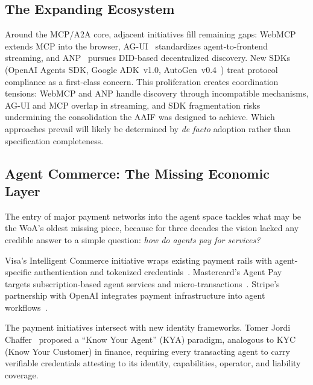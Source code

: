 \documentclass{IEEEcsmag}
\begin{document}
\subsection{The Expanding Ecosystem}\label{sec:ecosystem}

Around the MCP/A2A core, adjacent initiatives fill remaining gaps: WebMCP~\cite{WebMCP_W3C_2025} extends MCP into the browser, AG-UI~\cite{AGUI_2025} standardizes agent-to-frontend streaming, and ANP~\cite{W3C_ANP_2025} pursues DID-based decentralized discovery. New SDKs (OpenAI Agents SDK, Google ADK~v1.0, AutoGen~v0.4~\cite{Microsoft_AutoGen_2023}) treat protocol compliance as a first-class concern.  This proliferation creates coordination tensions: WebMCP and ANP handle discovery through incompatible mechanisms, AG-UI and MCP overlap in streaming, and SDK fragmentation risks undermining the consolidation the AAIF was designed to achieve.  Which approaches prevail will likely be determined by \emph{de facto} adoption rather than specification completeness.

\subsection{Agent Commerce: The Missing Economic Layer}\label{sec:commerce}

The entry of major payment networks into the agent space tackles what may be the WoA's oldest missing piece, because for three decades the vision lacked any credible answer to a simple question: \emph{how do agents pay for services?}

Visa's Intelligent Commerce initiative wraps existing payment rails with agent-specific authentication and tokenized credentials~\cite{Visa_TAP_2025}. Mastercard's Agent Pay targets subscription-based agent services and micro-transactions~\cite{Mastercard_AgentPay_2025}. Stripe's partnership with OpenAI integrates payment infrastructure into agent workflows~\cite{Stripe_OpenAI_ACP_2025}.

The payment initiatives intersect with new identity frameworks. Tomer Jordi Chaffer~\cite{KYA_Paradigm_2025} proposed a ``Know Your Agent'' (KYA) paradigm, analogous to KYC (Know Your Customer) in finance, requiring every transacting agent to carry verifiable credentials attesting to its identity, capabilities, operator, and liability coverage.


\end{document}
